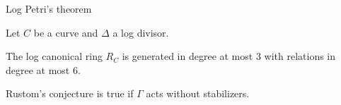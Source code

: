 \begin{frame}{Log Petri's theorem}


    Let $C$ be a curve and $\Delta$ a log divisor. 

  \begin{theorem}[Voight, ZB]
  The log canonical ring $R_C$ is generated in degree at most 3 with relations in degree at most 6.
  \end{theorem}

  \begin{corollary}
    Rustom's conjecture is true if $\Gamma$ acts without stabilizers.
  \end{corollary}


\end{frame}
